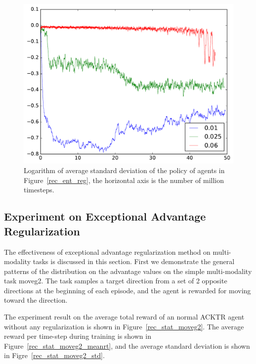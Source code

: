 \begin{figure}[!htbp]
	\includegraphics[width=\textwidth]{images/rec_std_ent_reg.pdf}
	\centering
	\caption{Logarithm of average standard deviation of the policy of agents in Figure~\ref{rec_ent_reg}, the horizontal axis is the number of million timesteps.}\label{rec_std_ent_reg}
\end{figure}

\subsection{Experiment on Exceptional Advantage Regularization}
The effectiveness of exceptional advantage regularization method on multi-modality tasks is discussed in this section.
First we demonstrate the general patterns of the distribution on the advantage values on the simple multi-modality task moveg2. The task samples a target direction from a set of 2 opposite directions at the beginning of each episode, and the agent is rewarded for moving toward the direction.

The experiment result on the average total reward of an normal ACKTR agent without any regularization is shown in Figure~\ref{rec_stat_moveg2}. The average reward per time-step during training is shown in Figure~\ref{rec_stat_moveg2_meanrt}, and the average standard deviation is shown in Figre~\ref{rec_stat_moveg2_std}.


